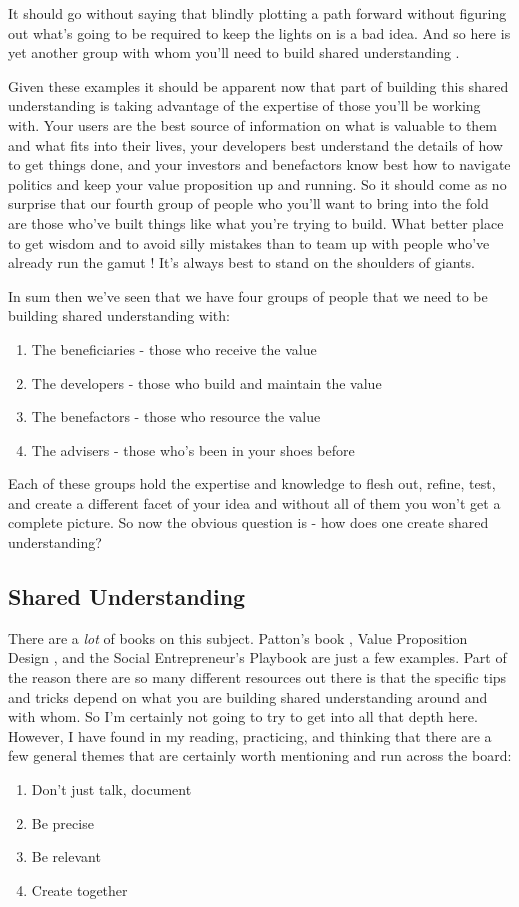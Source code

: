 \documentclass[11pt,a5paper]{book}
\begin{document}
It should go without saying that blindly plotting a path forward without figuring out what's going to be required to keep the lights on is a bad idea. And so here is yet another group with whom you'll need to build shared understanding \cite{macmillan}. 
\newline

Given these examples it should be apparent now that part of building this shared understanding is taking advantage of the expertise of those you'll be working with. Your users are the best source of information on what is valuable to them and what fits into their lives, your developers best understand the details of how to get things done, and your investors and benefactors know best how to navigate politics and keep your value proposition up and running. So it should come as no surprise that our fourth group of people who you'll want to bring into the fold are those who've built things like what you're trying to build. What better place to get wisdom and to avoid silly mistakes than to team up with people who've already run the gamut \cite{macmillan}! It's always best to stand on the shoulders of giants. 
\newline

In sum then we've seen that we have four groups of people that we need to be building shared understanding with:
\begin{enumerate}
\item The beneficiaries - those who receive the value
\item The developers - those who build and maintain the value
\item The benefactors - those who resource the value
\item The advisers - those who's been in your shoes before
\end{enumerate}  
Each of these groups hold the expertise and knowledge to flesh out, refine, test, and create a different facet of your idea and without all of them you won't get a complete picture. So now the obvious question is - how does one create shared understanding?

\subsection{Shared Understanding}
There are a \textit{lot} of books on this subject. Patton's book \cite{patton}, Value Proposition Design \cite{valueprop}, and the Social Entrepreneur's Playbook \cite{macmillan} are just a few examples. Part of the reason there are so many different resources out there is that the specific tips and tricks depend on what you are building shared understanding around and with whom. So I'm certainly not going to try to get into all that depth here. However, I have found in my reading, practicing, and thinking that there are a few general themes that are certainly worth mentioning and run across the board:
\begin{enumerate}
\item Don't just talk, document
\item Be precise
\item Be relevant
\item Create together
\end{enumerate}
\end{document}
